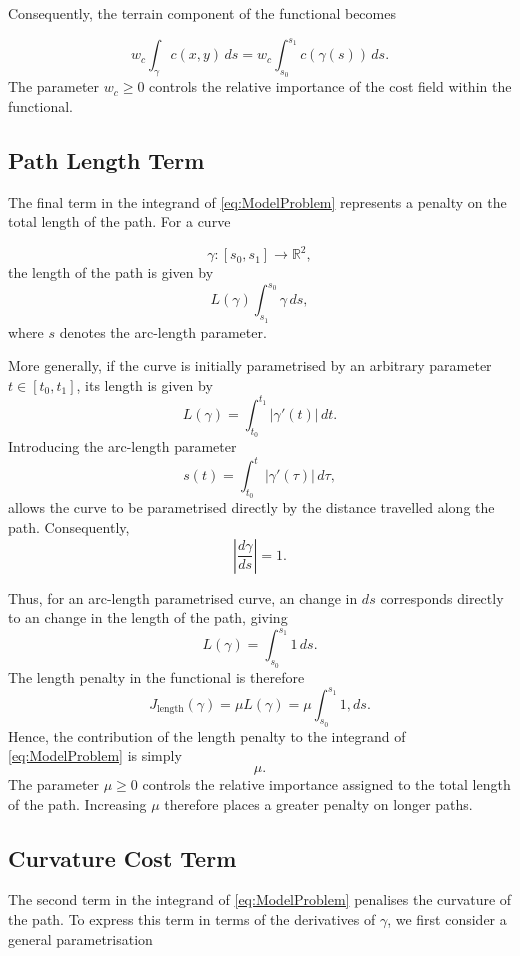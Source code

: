 Consequently, the terrain component of the functional becomes

$$
w_c\int_\gamma c(x,y)\,ds
=
w_c\int_{s_0}^{s_1}c(\gamma(s))\,ds.
$$
The parameter $w_c \geq 0$ controls the relative importance of the cost field within the functional.

\subsection{Path Length Term}
\label{subsec:length_penalty}

The final term in the integrand of \eqref{eq:ModelProblem} represents a
penalty on the total length of the path. For a curve

$$
\gamma:[s_0,s_1]\rightarrow\mathbb{R}^2,
$$
the length of the path is given by
\begin{equation}
L(\gamma)
\int_{s_1}^{s_0}\gamma \, ds,
\label{eq:path_length}
\end{equation}
where $s$ denotes the arc-length parameter.

More generally, if the curve is initially parametrised by an arbitrary parameter  
$t\in[t_0,t_1]$, its length is given by
$$
L(\gamma)
=
\int_{t_0}^{t_1}
|\gamma'(t)|\,dt.
$$
Introducing the arc-length parameter
$$
s(t)
=
\int_{t_0}^{t}
|\gamma'(\tau)|\,d\tau,
$$
allows the curve to be parametrised directly by the distance travelled
along the path. Consequently,
$$
|\frac{d\gamma}{ds}|=1.
$$

Thus, for an arc-length parametrised curve, an change in $ds$
corresponds directly to an change in the length of the path, giving
$$
L(\gamma)
=
\int_{s_0}^{s_1}1\,ds.
$$
The length penalty in the functional is therefore
\begin{equation}
J_{\mathrm{length}}(\gamma) =   \mu L(\gamma) =
\mu\int_{s_0}^{s_1}1,ds.
\label{eq:length_functional}
\end{equation}
Hence, the contribution of the length penalty to the integrand of
\eqref{eq:ModelProblem} is simply
$$
\mu.
$$
The parameter $\mu\geq0$ controls the relative importance assigned to
the total length of the path. Increasing $\mu$ therefore places a
greater penalty on longer paths.


\subsection{Curvature Cost Term}
\label{subsec:curvature_penalty}

The second term in the integrand of \eqref{eq:ModelProblem} penalises
the curvature of the path. To express this term in terms of the
derivatives of $\gamma$, we first consider a general parametrisation

